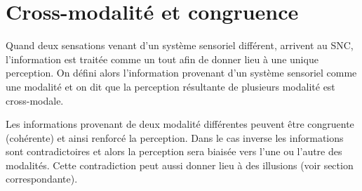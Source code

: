 \section{Cross-modalité et congruence}
Quand deux sensations venant d’un système sensoriel différent, arrivent au SNC, l’information est traitée comme un tout afin de donner lieu à une unique perception. On défini alors l’information provenant d’un système sensoriel comme une modalité et on dit que la perception résultante de plusieurs modalité est cross-modale.\par
Les informations provenant de deux modalité différentes peuvent être congruente (cohérente) et ainsi renforcé la perception. Dans le cas inverse les informations sont contradictoires et alors la perception sera biaisée vers l’une ou l’autre des modalités. Cette contradiction peut aussi donner lieu à des illusions (voir section correspondante).\par

